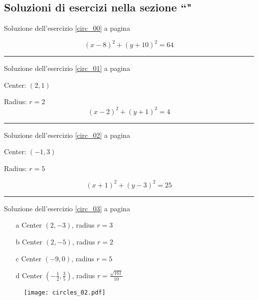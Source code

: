 
\subsection{Soluzioni di esercizi nella sezione ``\textbf{}"}


Soluzione dell'esercizio \ref{circ_00} a pagina \pageref{circ_00}\label{circs_00}

\[
(x-8)^2+(y+10)^2=64
\]

\vspace{1cm}
\hrule
\vspace{1cm}


Soluzione dell'esercizio \ref{circ_01} a pagina \pageref{circ_01}\label{circs_01}

Center: $(2,1)$

Radius: $r=2$
\[
(x-2)^2+(y+1)^2=4
\]

\vspace{1cm}
\hrule
\vspace{1cm}


Soluzione dell'esercizio \ref{circ_02} a pagina \pageref{circ_02}\label{circs_02}

Center: $(-1,3)$

Radius:  $r=5$

\[
(x+1)^2+(y-3)^2=25  
\]

\vspace{1cm}
\hrule
\vspace{1cm}


Soluzione dell'esercizio \ref{circ_03} a pagina \pageref{circ_03}\label{circs_03}

\begin{itemize}
\item[a] Center $(2,-3)$, radius  $r=3$
\item[b] Center $(2,-5)$, radius  $r=2$
\item[c] Center $(-9,0)$, radius  $r=5$
\item[d] Center $(-\frac{1}{2},\frac{3}{5})$, radius  $r=\frac{\sqrt{161}}{10}$
\end{itemize}


\begin{figure}[H]
\centering
\texttt{[image: circles\_02.pdf]}
\end{figure}




